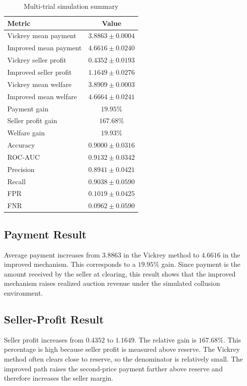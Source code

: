 \documentclass[conference]{IEEEtran}
\begin{document}
\begin{table}[htbp]
\caption{Multi-trial simulation summary}
\label{tab:results}
\centering
\begin{tabular}{lc}
\toprule
\textbf{Metric} & \textbf{Value} \\
\midrule
Vickrey mean payment & $3.8863 \pm 0.0004$ \\
Improved mean payment & $4.6616 \pm 0.0240$ \\
Vickrey seller profit & $0.4352 \pm 0.0193$ \\
Improved seller profit & $1.1649 \pm 0.0276$ \\
Vickrey mean welfare & $3.8909 \pm 0.0003$ \\
Improved mean welfare & $4.6664 \pm 0.0241$ \\
\midrule
Payment gain & $19.95\%$ \\
Seller profit gain & $167.68\%$ \\
Welfare gain & $19.93\%$ \\
\midrule
Accuracy & $0.9000 \pm 0.0316$ \\
ROC-AUC & $0.9132 \pm 0.0342$ \\
Precision & $0.8941 \pm 0.0421$ \\
Recall & $0.9038 \pm 0.0590$ \\
FPR & $0.1019 \pm 0.0425$ \\
FNR & $0.0962 \pm 0.0590$ \\
\bottomrule
\end{tabular}
\end{table}

\subsection{Payment Result}
Average payment increases from $3.8863$ in the Vickrey method to $4.6616$ in the improved mechanism. This corresponds to a $19.95\%$ gain. Since payment is the amount received by the seller at clearing, this result shows that the improved mechanism raises realized auction revenue under the simulated collusion environment.

\subsection{Seller-Profit Result}
Seller profit increases from $0.4352$ to $1.1649$. The relative gain is $167.68\%$. This percentage is high because seller profit is measured above reserve. The Vickrey method often clears close to reserve, so the denominator is relatively small. The improved path raises the second-price payment farther above reserve and therefore increases the seller margin.
\end{document}
